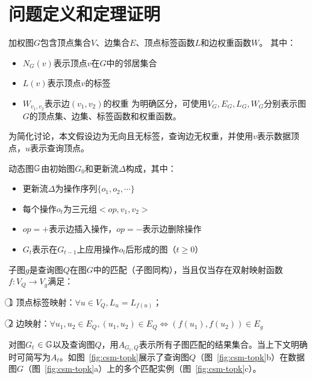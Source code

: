 \section{问题定义和定理证明}
\label{ch3:definition}
\begin{definition}[加权图]
    加权图$G$包含顶点集合$V$、边集合$E$、顶点标签函数$L$和边权重函数$W$。
    其中：

    \begin{itemize}
    \item $N_G(v)$表示顶点$v$在$G$中的邻居集合
    \item $L(v)$表示顶点$v$的标签
    \item $W_{v_1, v_2}$表示边$(v_1, v_2)$的权重
    为明确区分，可使用$V_G, E_G, L_G, W_G$分别表示图$G$的顶点集、边集、标签函数和权重函数。
    \end{itemize}  
    \end{definition}
    
    为简化讨论，本文假设边为无向且无标签，查询边无权重，并使用$v$表示数据顶点，$u$表示查询顶点。
    
    \begin{definition}[动态图]\label{def:dynamic-graph}
    动态图$\mathbb{G}$由初始图$G_0$和更新流$\Delta$构成，其中：

    \begin{itemize}
    \item 更新流$\Delta$为操作序列$\{o_1, o_2, \cdots\}$
    \item 每个操作$o_t$为三元组$<op, v_1, v_2>$
    \item $op=+$表示边插入操作，$op=-$表示边删除操作
    \item  $G_t$表示在$G_{t-1}$上应用操作$o_t$后形成的图（$t \geq 0$）    
    \end{itemize} 
    \end{definition}
    
    \begin{definition}[子图匹配]\label{def:subgraph-matching}
    子图$g$是查询图$Q$在图$G$中的匹配（子图同构），当且仅当存在双射映射函数$f: V_Q \rightarrow V_g$满足：
    
    \textcircled{1} 顶点标签映射：$\forall u \in V_Q, L_u = L_{f(u)}$；
    
    \textcircled{2} 边映射：$\forall u_1, u_2\in E_Q, (u_1, u_2) \in E_Q \Leftrightarrow (f(u_1), f(u_2)) \in E_g$
    \end{definition}
    
    对图$G_t$ $\in\mathbb{G}$以及查询图$Q$，用$A_{G_t,Q}$表示所有子图匹配的结果集合。当上下文明确时可简写为$A_t$。如图~\ref{fig:csm-topk}展示了查询图$Q$（图~\ref{fig:csm-topk}b）在数据图$G$（图~\ref{fig:csm-topk}a）上的多个匹配实例（图~\ref{fig:csm-topk}c）。
    
